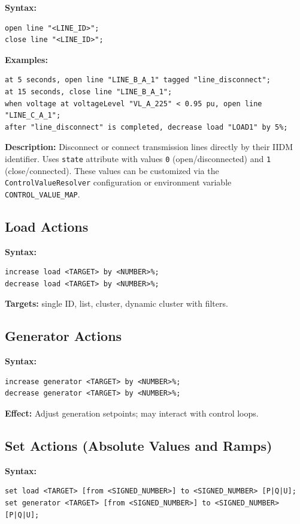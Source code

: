 \documentclass[12pt]{article}
\begin{document}
\textbf{Syntax:}
\begin{lstlisting}
open line "<LINE_ID>";
close line "<LINE_ID>";
\end{lstlisting}

\textbf{Examples:}
\begin{lstlisting}
at 5 seconds, open line "LINE_B_A_1" tagged "line_disconnect";
at 15 seconds, close line "LINE_B_A_1";
when voltage at voltageLevel "VL_A_225" < 0.95 pu, open line "LINE_C_A_1";
after "line_disconnect" is completed, decrease load "LOAD1" by 5%;
\end{lstlisting}

\textbf{Description:} Disconnect or connect transmission lines directly by their IIDM identifier. Uses
\texttt{state} attribute with values \texttt{0} (open/disconnected) and \texttt{1} (close/connected). These values
can be customized via the \texttt{ControlValueResolver} configuration or environment variable
\texttt{CONTROL\_VALUE\_MAP}.

\subsection{Load Actions}

\textbf{Syntax:}
\begin{lstlisting}
increase load <TARGET> by <NUMBER>%;
decrease load <TARGET> by <NUMBER>%;
\end{lstlisting}

\textbf{Targets:} single ID, list, cluster, dynamic cluster with filters.

\subsection{Generator Actions}

\textbf{Syntax:}
\begin{lstlisting}
increase generator <TARGET> by <NUMBER>%;
decrease generator <TARGET> by <NUMBER>%;
\end{lstlisting}

\textbf{Effect:} Adjust generation setpoints; may interact with control loops.

\subsection{Set Actions (Absolute Values and Ramps)}

\textbf{Syntax:}
\begin{lstlisting}
set load <TARGET> [from <SIGNED_NUMBER>] to <SIGNED_NUMBER> [P|Q|U];
set generator <TARGET> [from <SIGNED_NUMBER>] to <SIGNED_NUMBER> [P|Q|U];
\end{lstlisting}
\end{document}

